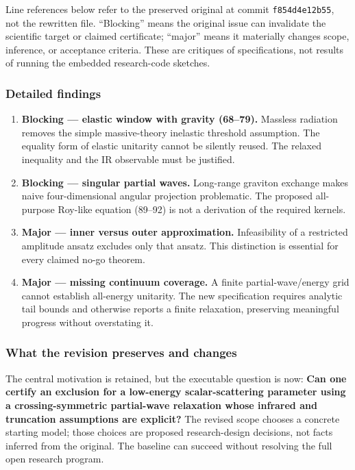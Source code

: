 \documentclass[
  11pt,
]{article}
\begin{document}
Line references below refer to the preserved original at commit
\texttt{f854d4e12b55}, not the rewritten file. ``Blocking'' means the
original issue can invalidate the scientific target or claimed
certificate; ``major'' means it materially changes scope, inference, or
acceptance criteria. These are critiques of specifications, not results
of running the embedded research-code sketches.

\subsubsection{Detailed findings}

\begin{enumerate}
\def\labelenumi{\arabic{enumi}.}
\item
  \textbf{Blocking --- elastic window with gravity (68--79).} Massless
  radiation removes the simple massive-theory inelastic threshold
  assumption. The equality form of elastic unitarity cannot be silently
  reused. The relaxed inequality and the IR observable must be
  justified.
\item
  \textbf{Blocking --- singular partial waves.} Long-range graviton
  exchange makes naive four-dimensional angular projection problematic.
  The proposed all-purpose Roy-like equation (89--92) is not a
  derivation of the required kernels.
\item
  \textbf{Major --- inner versus outer approximation.} Infeasibility of
  a restricted amplitude ansatz excludes only that ansatz. This
  distinction is essential for every claimed no-go theorem.
\item
  \textbf{Major --- missing continuum coverage.} A finite
  partial-wave/energy grid cannot establish all-energy unitarity. The
  new specification requires analytic tail bounds and otherwise reports
  a finite relaxation, preserving meaningful progress without
  overstating it.
\end{enumerate}

\subsubsection{What the revision preserves and changes}

The central motivation is retained, but the executable question is now:
\textbf{Can one certify an exclusion for a low-energy scalar-scattering
parameter using a crossing-symmetric partial-wave relaxation whose
infrared and truncation assumptions are explicit?} The revised scope
chooses a concrete starting model; those choices are proposed
research-design decisions, not facts inferred from the original. The
baseline can succeed without resolving the full open research program.
\end{document}
